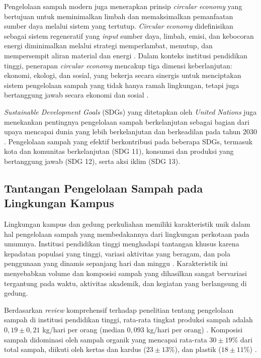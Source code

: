 Pengelolaan sampah modern juga menerapkan prinsip \textit{circular economy} yang bertujuan untuk meminimalkan limbah dan memaksimalkan pemanfaatan sumber daya melalui sistem yang tertutup. \textit{Circular economy} didefinisikan sebagai sistem regeneratif yang \textit{input} sumber daya, limbah, emisi, dan kebocoran energi diminimalkan melalui strategi memperlambat, menutup, dan mempersempit aliran material dan energi \autocite{geissdoerfer2017}. Dalam konteks institusi pendidikan tinggi, penerapan \textit{circular economy} mencakup tiga dimensi keberlanjutan: ekonomi, ekologi, dan sosial, yang bekerja secara sinergis untuk menciptakan sistem pengelolaan sampah yang tidak hanya ramah lingkungan, tetapi juga bertanggung jawab secara ekonomi dan sosial \autocite{giurea2024}.

\textit{Sustainable Development Goals} (SDGs) yang ditetapkan oleh \textit{United Nations} juga menekankan pentingnya pengelolaan sampah berkelanjutan sebagai bagian dari upaya mencapai dunia yang lebih berkelanjutan dan berkeadilan pada tahun 2030 \autocite{un2015}. Pengelolaan sampah yang efektif berkontribusi pada beberapa SDGs, termasuk kota dan komunitas berkelanjutan (SDG 11), konsumsi dan produksi yang bertanggung jawab (SDG 12), serta aksi iklim (SDG 13).

\subsection{Tantangan Pengelolaan Sampah pada Lingkungan Kampus}

Lingkungan kampus dan gedung perkuliahan memiliki karakteristik unik dalam hal pengelolaan sampah yang membedakannya dari lingkungan perkotaan pada umumnya. Institusi pendidikan tinggi menghadapi tantangan khusus karena kepadatan populasi yang tinggi, variasi aktivitas yang beragam, dan pola penggunaan yang dinamis sepanjang hari dan minggu \autocite{bahcelioglu2020}. Karakteristik ini menyebabkan volume dan komposisi sampah yang dihasilkan sangat bervariasi tergantung pada waktu, aktivitas akademik, dan kegiatan yang berlangsung di gedung.

Berdasarkan \textit{review} komprehensif terhadap penelitian tentang pengelolaan sampah di institusi pendidikan tinggi, rata-rata tingkat produksi sampah adalah $0{,}19 \pm 0{,}21$ kg/hari per orang (median $0{,}093$ kg/hari per orang) \autocite{rodriguez2024}. Komposisi sampah didominasi oleh sampah organik yang mencapai rata-rata $30 \pm 19$\% dari total sampah, diikuti oleh kertas dan kardus ($23 \pm 13$\%), dan plastik ($18 \pm 11$\%) \autocite{bahcelioglu2020}.

